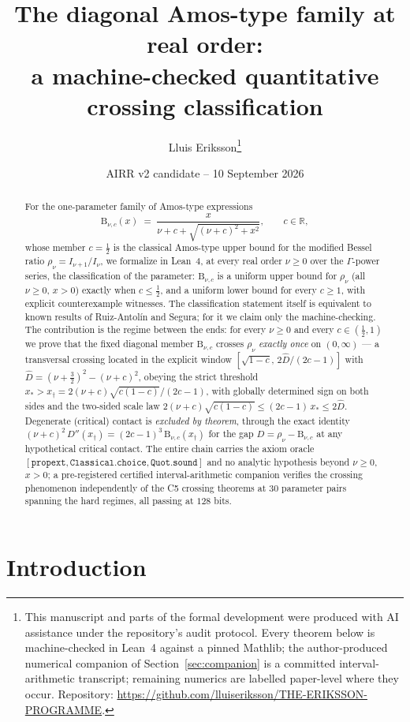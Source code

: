 \documentclass[11pt]{article}
\title{The diagonal Amos-type family at real order:\\
a machine-checked quantitative crossing classification}
\author{Lluis Eriksson\thanks{This manuscript and parts of the formal
development were produced with AI assistance under the repository's
audit protocol.  Every theorem below is machine-checked in Lean~4
against a pinned Mathlib; the author-produced numerical companion of
Section~\ref{sec:companion} is a committed interval-arithmetic
transcript; remaining numerics are labelled paper-level where they
occur.  Repository:
\url{https://github.com/lluiseriksson/THE-ERIKSSON-PROGRAMME}.}}
\date{AIRR v2 candidate -- 10 September 2026}
\newcommand{\lean}[1]{\texttt{#1}}
\newcommand{\Bfam}{\mathrm{B}}
\begin{document}
\maketitle

\begin{abstract}
For the one-parameter family of Amos-type expressions
\[
\Bfam_{\nu,c}(x) \;=\; \frac{x}{\nu+c+\sqrt{(\nu+c)^2+x^2}},
\qquad c \in \mathbb{R},
\]
whose member $c = \tfrac12$ is the classical Amos-type upper bound
for the modified Bessel ratio $\rho_\nu = I_{\nu+1}/I_\nu$, we
formalize in Lean~4, at every real order $\nu \ge 0$ over the
$\Gamma$-power series, the classification of the parameter:
$\Bfam_{\nu,c}$ is a uniform upper bound for $\rho_\nu$ (all
$\nu \ge 0$, $x > 0$) exactly when $c \le \tfrac12$, and a uniform
lower bound for every $c \ge 1$, with explicit counterexample
witnesses.  The classification statement itself is
equivalent to known results of Ruiz-Antol\'in and Segura; for it we
claim only the machine-checking.  The contribution is the regime
between the ends: for every $\nu \ge 0$ and every
$c \in (\tfrac12, 1)$ we prove that the fixed diagonal member
$\Bfam_{\nu,c}$ crosses $\rho_\nu$ \emph{exactly once} on
$(0,\infty)$ --- a transversal crossing located in the explicit
window $[\sqrt{1-c},\, 2\hat{D}/(2c-1)]$ with
$\hat{D} = (\nu+\tfrac32)^2 - (\nu+c)^2$, obeying the strict
threshold $x_* > x_\dagger = 2(\nu+c)\sqrt{c(1-c)}/(2c-1)$, with
globally determined sign on both sides and the two-sided scale law
$2(\nu+c)\sqrt{c(1-c)} \le (2c-1)\,x_* \le 2\hat{D}$.  Degenerate
(critical) contact is \emph{excluded by theorem}, through the exact
identity $(\nu+c)^2\,D''(x_\dagger) = (2c-1)^3\,\Bfam_{\nu,c}(x_\dagger)$
for the gap $D = \rho_\nu - \Bfam_{\nu,c}$ at any hypothetical
critical contact.  The entire chain carries the
axiom oracle
$[\lean{propext}, \lean{Classical.choice}, \lean{Quot.sound}]$ and
no analytic hypothesis beyond $\nu \ge 0$, $x > 0$; a pre-registered
certified interval-arithmetic companion verifies the crossing
phenomenon independently of the C5 crossing theorems at $30$ parameter
pairs spanning the hard regimes, all passing at $128$ bits.
\end{abstract}

\section{Introduction}
\end{document}
